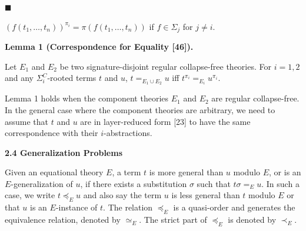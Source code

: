  
 
\par\noindent  $\blacksquare$ 
 
$(f(t_{1},\dots,t_{n}))^{\pi_{i}}=\pi(f(t_{1},\dots,t_{n}))$ if $f\in\Sigma_{j}$ for $j\neq i$.\par
 
 
  
 
 
\par\medskip\noindent\textbf{Lemma 1 (Correspondence for Equality [46]).}\par
 
 
Let $E_{1}$ and $E_{2}$ be two signature-disjoint regular collapse-free theories. For $i=1,2$ and any ${\Sigma}^{C}_{i}$-rooted terms $t$ and $u$, $t=_{E_{1}\cup E_{2}}u$ iff $t^{\pi_{i}}=_{E_{i}}u^{\pi_{i}}$.\par
 
 
 
 
Lemma 1 holds when the component theories $E_{1}$ and $E_{2}$ are regular collapse-free. In the general case where the component theories are arbitrary, we need to assume that $t$ and $u$ are in layer-reduced form [23] to have the same correspondence with their $i$-abstractions.\par
 
 
 
 
\par\medskip\noindent\textbf{2.4 Generalization Problems}\par
 
 
Given an equational theory $E$, a term $t$ is more general than $u$ modulo $E$, or is an $E$-generalization of $u$, if there exists a substitution $\sigma$ such that $t\sigma=_{E}u$. In such a case, we write $t\preceq_{E}u$ and also say the term $u$ is less general than $t$ modulo $E$ or that $u$ is an $E$-instance of $t$. The relation $\preceq_{E}$ is a quasi-order and generates the equivalence relation, denoted by $\simeq_{E}$. The strict part of $\preceq_{E}$ is denoted by $\prec_{E}$.\par
 
